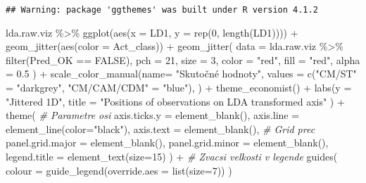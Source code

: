 \documentclass[
]{article}
\newenvironment{Shaded}{\begin{snugshade}}{\end{snugshade}}
\newcommand{\AttributeTok}[1]{\textcolor[rgb]{0.77,0.63,0.00}{#1}}
\newcommand{\CommentTok}[1]{\textcolor[rgb]{0.56,0.35,0.01}{\textit{#1}}}
\newcommand{\ConstantTok}[1]{\textcolor[rgb]{0.00,0.00,0.00}{#1}}
\newcommand{\DecValTok}[1]{\textcolor[rgb]{0.00,0.00,0.81}{#1}}
\newcommand{\FloatTok}[1]{\textcolor[rgb]{0.00,0.00,0.81}{#1}}
\newcommand{\FunctionTok}[1]{\textcolor[rgb]{0.00,0.00,0.00}{#1}}
\newcommand{\NormalTok}[1]{#1}
\newcommand{\OtherTok}[1]{\textcolor[rgb]{0.56,0.35,0.01}{#1}}
\newcommand{\SpecialCharTok}[1]{\textcolor[rgb]{0.00,0.00,0.00}{#1}}
\newcommand{\StringTok}[1]{\textcolor[rgb]{0.31,0.60,0.02}{#1}}
\begin{document}
\begin{verbatim}
## Warning: package 'ggthemes' was built under R version 4.1.2
\end{verbatim}

\begin{Shaded}
\begin{Highlighting}[]
\NormalTok{lda.raw.viz }\SpecialCharTok{\%\textgreater{}\%}
    \FunctionTok{ggplot}\NormalTok{(}\FunctionTok{aes}\NormalTok{(}\AttributeTok{x =}\NormalTok{ LD1, }\AttributeTok{y =} \FunctionTok{rep}\NormalTok{(}\DecValTok{0}\NormalTok{, }\FunctionTok{length}\NormalTok{(LD1)))) }\SpecialCharTok{+}
    \FunctionTok{geom\_jitter}\NormalTok{(}\FunctionTok{aes}\NormalTok{(}\AttributeTok{color =}\NormalTok{ Act\_class)) }\SpecialCharTok{+}
    \FunctionTok{geom\_jitter}\NormalTok{(}
        \AttributeTok{data =}\NormalTok{ lda.raw.viz }\SpecialCharTok{\%\textgreater{}\%}
            \FunctionTok{filter}\NormalTok{(Pred\_OK }\SpecialCharTok{==} \ConstantTok{FALSE}\NormalTok{),}
        \AttributeTok{pch =} \DecValTok{21}\NormalTok{,}
        \AttributeTok{size =} \DecValTok{3}\NormalTok{,}
        \AttributeTok{color =} \StringTok{"red"}\NormalTok{,}
        \AttributeTok{fill =} \StringTok{"red"}\NormalTok{,}
        \AttributeTok{alpha =} \FloatTok{0.5}
\NormalTok{    ) }\SpecialCharTok{+}
    \FunctionTok{scale\_color\_manual}\NormalTok{(}\AttributeTok{name=} \StringTok{"Skutočné hodnoty"}\NormalTok{,}
                       \AttributeTok{values =} \FunctionTok{c}\NormalTok{(}\StringTok{"CM/ST"} \OtherTok{=} \StringTok{"darkgrey"}\NormalTok{, }\StringTok{"CM/CAM/CDM"} \OtherTok{=} \StringTok{"blue"}\NormalTok{),}
\NormalTok{                       ) }\SpecialCharTok{+}
    \FunctionTok{theme\_economist}\NormalTok{() }\SpecialCharTok{+} 
    \FunctionTok{labs}\NormalTok{(}\AttributeTok{y =} \StringTok{"Jittered 1D"}\NormalTok{,}
         \AttributeTok{title =} \StringTok{"Positions of observations on LDA transformed axis"}
\NormalTok{    ) }\SpecialCharTok{+} 
    \FunctionTok{theme}\NormalTok{(}
        \CommentTok{\# Parametre osi}
        \AttributeTok{axis.ticks.y =} \FunctionTok{element\_blank}\NormalTok{(),}
        \AttributeTok{axis.line =} \FunctionTok{element\_line}\NormalTok{(}\AttributeTok{color=}\StringTok{"black"}\NormalTok{),}
        \AttributeTok{axis.text =} \FunctionTok{element\_blank}\NormalTok{(),}
        \CommentTok{\# Grid prec}
        \AttributeTok{panel.grid.major =} \FunctionTok{element\_blank}\NormalTok{(),}
        \AttributeTok{panel.grid.minor =} \FunctionTok{element\_blank}\NormalTok{(),}
        \AttributeTok{legend.title =} \FunctionTok{element\_text}\NormalTok{(}\AttributeTok{size=}\DecValTok{15}\NormalTok{)}
\NormalTok{    ) }\SpecialCharTok{+}
    \CommentTok{\# Zvacsi velkosti v legende}
    \FunctionTok{guides}\NormalTok{(}
        \AttributeTok{colour =} \FunctionTok{guide\_legend}\NormalTok{(}\AttributeTok{override.aes =} \FunctionTok{list}\NormalTok{(}\AttributeTok{size=}\DecValTok{7}\NormalTok{))}
\NormalTok{        )}
\end{Highlighting}
\end{Shaded}
\end{document}
